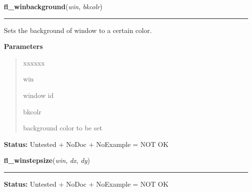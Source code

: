 \hspace{.8\funcindent}\begin{boxedminipage}{\funcwidth}

    \raggedright \textbf{fl\_winbackground}(\textit{win}, \textit{bkcolr})

    \vspace{-1.5ex}

    \rule{\textwidth}{0.5\fboxrule}
\setlength{\parskip}{2ex}
    Sets the background of window to a certain color.

\setlength{\parskip}{1ex}
      \textbf{Parameters}
      \vspace{-1ex}

      \begin{quote}
        \begin{Ventry}{xxxxxx}

          \item[win]

          window id

          \item[bkcolr]

          background color to be set

        \end{Ventry}

      \end{quote}

\textbf{Status:} Untested + NoDoc + NoExample = NOT OK



    \end{boxedminipage}

    \label{xformslib:library:fl_winstepsize}

    \vspace{0.5ex}

\hspace{.8\funcindent}\begin{boxedminipage}{\funcwidth}

    \raggedright \textbf{fl\_winstepsize}(\textit{win}, \textit{dx}, \textit{dy})

    \vspace{-1.5ex}

    \rule{\textwidth}{0.5\fboxrule}
\setlength{\parskip}{2ex}
\setlength{\parskip}{1ex}
\textbf{Status:} Untested + NoDoc + NoExample = NOT OK



    \end{boxedminipage}

